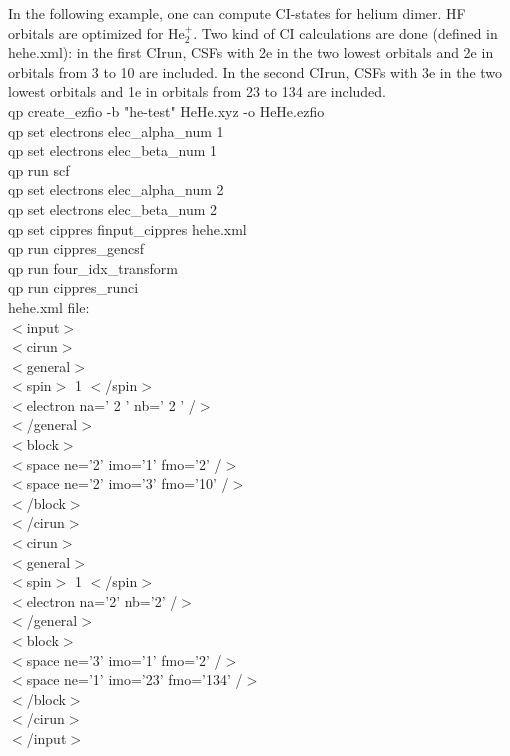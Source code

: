 \documentclass[a4paper, 10 pt]{report}
\begin{document}
In the following example, one can compute CI-states for helium dimer. HF orbitals are optimized for He$_2^+$. Two kind of CI calculations are done (defined in hehe.xml): in the first CIrun, CSFs with 2e in the two lowest orbitals and 2e in orbitals from 3 to 10 are included. In the second CIrun, CSFs with 3e in the two lowest orbitals and 1e in orbitals from 23 to 134 are included.\\

\noindent qp create\_ezfio -b "he-test" HeHe.xyz -o HeHe.ezfio\\
qp set electrons elec\_alpha\_num 1\\
qp set electrons elec\_beta\_num 1 \\
qp run scf\\
qp set electrons elec\_alpha\_num 2\\
qp set electrons elec\_beta\_num 2 \\
qp set cippres finput\_cippres hehe.xml\\
qp run cippres\_gencsf\\
qp run four\_idx\_transform\\
qp run cippres\_runci\\

\noindent hehe.xml file:\\
$<$input$>$\\
$<$cirun$>$\\
$<$general$>$\\
$<$spin$>$ 1 $<$/spin$>$\\
$<$electron na=' 2 ' nb=' 2 ' /$>$\\
$<$/general$>$\\
$<$block$>$\\
$<$space ne='2' imo='1' fmo='2' /$>$\\
$<$space ne='2' imo='3' fmo='10' /$>$\\
$<$/block$>$\\
$<$/cirun$>$\\
$<$cirun$>$\\
$<$general$>$\\
$<$spin$>$ 1 $<$/spin$>$\\
$<$electron na='2' nb='2' /$>$\\
$<$/general$>$\\
$<$block$>$\\
$<$space ne='3' imo='1' fmo='2' /$>$\\
$<$space ne='1' imo='23' fmo='134' /$>$\\
$<$/block$>$\\
$<$/cirun$>$\\
$<$/input$>$\\
\end{document}
